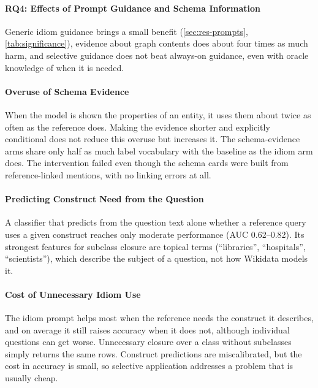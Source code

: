 \paragraph{RQ4: Effects of Prompt Guidance and Schema Information}

\label{sec:disc-rq4}

Generic idiom guidance brings a small benefit (\cref{sec:res-prompts}, \cref{tab:significance}), evidence about graph contents does about four times as much harm, and selective guidance does not beat always-on guidance, even with oracle knowledge of when it is needed.

\paragraph{Overuse of Schema Evidence}

When the model is shown the properties of an entity, it uses them about twice as often as the reference does.
Making the evidence shorter and explicitly conditional does not reduce this overuse but increases it.
The schema-evidence arms share only half as much label vocabulary with the baseline as the idiom arm does.
The intervention failed even though the schema cards were built from reference-linked mentions, with no linking errors at all.

\paragraph{Predicting Construct Need from the Question}

A classifier that predicts from the question text alone whether a reference query uses a given construct reaches only moderate performance (AUC 0.62--0.82).
Its strongest features for subclass closure are topical terms (``libraries'', ``hospitals'', ``scientists''), which describe the subject of a question, not how Wikidata models it.

\paragraph{Cost of Unnecessary Idiom Use}

The idiom prompt helps most when the reference needs the construct it describes, and on average it still raises accuracy when it does not, although individual questions can get worse.
Unnecessary closure over a class without subclasses simply returns the same rows.
Construct predictions are miscalibrated, but the cost in accuracy is small, so selective application addresses a problem that is usually cheap.

